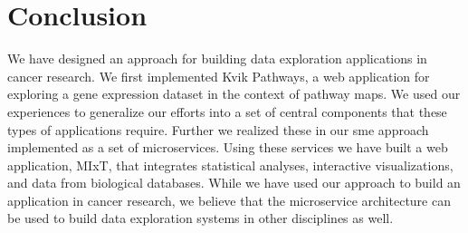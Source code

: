 \section{Conclusion}
We have designed an approach for building data exploration applications in
cancer research. We first implemented Kvik Pathways, a web application for
exploring a gene expression dataset in the context of pathway maps. We used our
experiences to generalize our efforts into a set of central components that
these types of applications require. Further we realized these in our \gls{sme}
approach implemented as a set of microservices.  Using these services we have
built a web application, MIxT, that integrates statistical analyses, interactive
visualizations, and data from biological databases. While we have used our
approach to build an application in cancer research, we believe that the
microservice architecture can be used to build data exploration systems in other
disciplines as well. 


